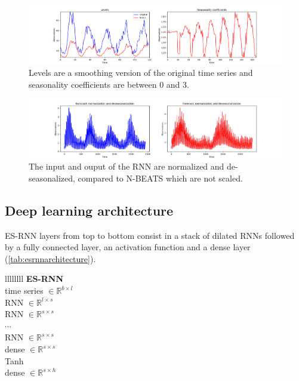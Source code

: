 \documentclass{article}
\begin{document}
 \begin{figure}[!ht]
\centering
	\includegraphics[width=0.9\columnwidth]{H344_levels_seasonalities.png} 
\caption{Levels are a smoothing version of the original time series and \\ seasonality coefficients are between 0 and 3.}
\label{fig:levelsseasonality}
\end{figure}

\begin{figure}[!ht]
\centering
	\includegraphics[width=0.9\columnwidth]{H344_windows.png} 
\caption{The input and ouput of the RNN are normalized and de-seasonalized, compared to N-BEATS which are not scaled.}
\label{fig:normalizeddeseasonalized}
\end{figure}

\newpage 
\subsection{Deep learning architecture}

ES-RNN layers from top to bottom consist in a stack of dilated RNNs followed by a fully connected layer, an activation function and a dense layer (\autoref{tab:esrnnarchitecture}).

 \begin{table}[!ht]
	\centering
	\begin{tabular}{llllllll} 
		\midrule
			 {\textbf{ES-RNN}} \\
		\midrule
			 {time series $\in \mathbb{R}^{b \times l}$} \\
		\midrule
			 {RNN  $\in \mathbb{R}^{l \times s}$} \\		
		\midrule
			 {RNN  $\in \mathbb{R}^{s \times s}$} \\		
		\midrule
			 {$\cdots$} \\		
		\midrule
			 {RNN  $\in \mathbb{R}^{s \times s}$} \\		
		\midrule
			 {dense  $\in \mathbb{R}^{s \times s}$} \\		
		\midrule
			 {Tanh} \\		
		\midrule
			 {dense  $\in \mathbb{R}^{s \times h}$} \\		
		\midrule
	\end{tabular}
	\caption{ES-RNN architecture. Let $b$ the batch size, l the length of the time series, s the embedding dimensional state size and h the length of the prediction.}
	\label{tab:esrnnarchitecture}
\end{table}
\end{document}
